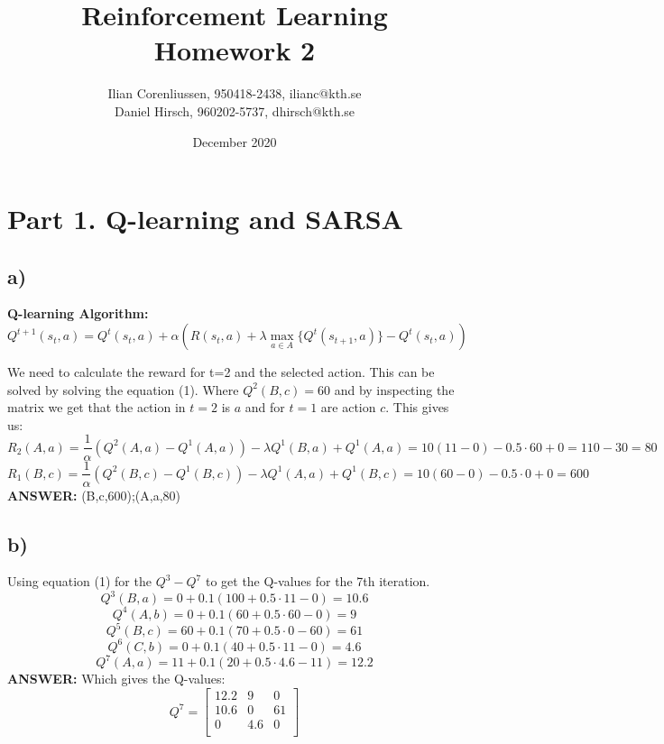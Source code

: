 \documentclass{article}
\title{Reinforcement Learning\\
       Homework 2}
\author{Ilian Corenliussen, 950418-2438, ilianc@kth.se\\ 
        Daniel Hirsch, 960202-5737, dhirsch@kth.se}
\date{December 2020}
\begin{document}
\maketitle

\section*{Part 1. Q-learning and SARSA}
\subsection*{a)}
\textbf{Q-learning Algorithm:} \begin{equation}
 Q^{t+1}(s_t,a) = Q^t(s_t,a) + \alpha \left(R(s_t,a) + \lambda \max_{a \in A}\{Q^t(s_{t+1}, a)\} - Q^t(s_t,a) \right)\end{equation}

We need to calculate the reward for t=2 and the selected action. This can be solved by solving the equation (1). Where $Q^2(B,c)=60$ and by inspecting the matrix we get that the action in $t=2$ is $a$ and for $t=1$ are action $c$. This gives us:
\begin{equation*}
    R_2(A,a) =  \frac{1}{\alpha}(Q^{2}(A,a) - Q^1(A,a) ) - \lambda Q^1(B, a) + Q^1(A,a) = 10( 11 - 0) - 0.5\cdot60 + 0 = 110-30= 80
\end{equation*}
\begin{equation*}
    R_1(B,c) =  \frac{1}{\alpha}(Q^{2}(B,c) - Q^1(B,c) ) - \lambda Q^1(A, a) + Q^1(B, c) = 10( 60 - 0) - 0.5\cdot 0 + 0 = 600
\end{equation*}
\textbf{ANSWER:} (B,c,600);(A,a,80)

\subsection*{b)}
Using equation (1) for the $Q^3-Q^7$ to get the Q-values for the 7th iteration.
\begin{equation*}
     Q^{3}(B,a) = 0 + 0.1(100 + 0.5\cdot11 - 0 ) = 10.6
\end{equation*}
\begin{equation*}
     Q^{4}(A,b) = 0 + 0.1(60 + 0.5\cdot60 - 0 ) = 9
\end{equation*}
\begin{equation*}
     Q^{5}(B,c) = 60 + 0.1(70 + 0.5\cdot0 -60 ) = 61
\end{equation*}
\begin{equation*}
     Q^{6}(C,b) = 0 + 0.1(40 + 0.5\cdot11 - 0 ) = 4.6
\end{equation*}
\begin{equation*}
     Q^{7}(A,a) = 11 + 0.1(20 + 0.5\cdot4.6 -11 ) = 12.2
\end{equation*}
\textbf{ANSWER:} Which gives the Q-values:
\begin{equation*}
    Q^7=
    \left[
    \begin{array}{ccc}
         12.2 & 9 & 0 \\
         10.6 & 0 & 61 \\
         0 & 4.6 & 0 \\
    \end{array}
    \right]
\end{equation*}
\end{document}
